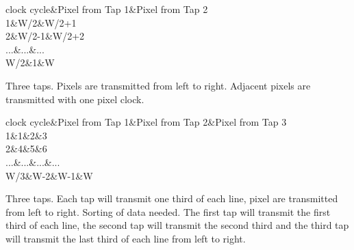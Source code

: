 \begin{Desc}
\begin{description}
\begin{TabularC}{3}
\hline
clock cycle&Pixel from Tap 1&Pixel from Tap 2 \\
1&W/2&W/2+1 \\
2&W/2-\/1&W/2+2 \\
...&...&... \\
W/2&1&W \\
\end{TabularC}
\item[{\em 
\hypertarget{group___device_specific_interface_gga25ba65893f1ee0e7de99cb51bb858d99a95ecc2f776f3f827f475497e0053c911}{cltxg1\+X3}\label{group___device_specific_interface_gga25ba65893f1ee0e7de99cb51bb858d99a95ecc2f776f3f827f475497e0053c911}
}]Three taps. Pixels are transmitted from left to right. Adjacent pixels are transmitted with one pixel clock.

\begin{TabularC}{4}
\hline
clock cycle&Pixel from Tap 1&Pixel from Tap 2&Pixel from Tap 3 \\
1&1&2&3 \\
2&4&5&6 \\
...&...&...&... \\
W/3&W-\/2&W-\/1&W \\
\end{TabularC}
\item[{\em 
\hypertarget{group___device_specific_interface_gga25ba65893f1ee0e7de99cb51bb858d99aef7ad32542f88ac52ae8616e8997df1b}{cltxg3\+X}\label{group___device_specific_interface_gga25ba65893f1ee0e7de99cb51bb858d99aef7ad32542f88ac52ae8616e8997df1b}
}]Three taps. Each tap will transmit one third of each line, pixel are transmitted from left to right. Sorting of data needed. The first tap will transmit the first third of each line, the second tap will transmit the second third and the third tap will transmit the last third of each line from left to right.


\end{description}
\end{Desc}
